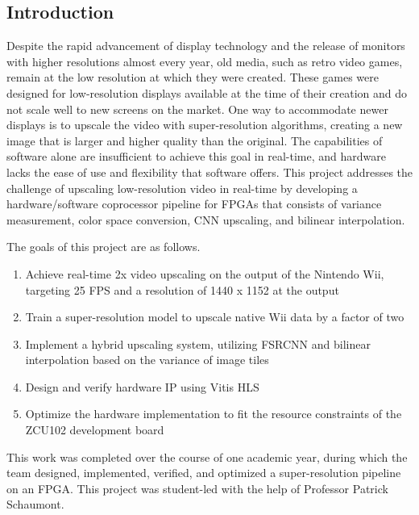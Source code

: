 \documentclass{article}
\begin{document}
\subsection*{Introduction} 
\noindent Despite the rapid advancement of display technology and the release of monitors with higher resolutions almost every year, old media, such as retro video games, remain at the low resolution at which they were created. These games were designed for low-resolution displays available at the time of their creation and do not scale well to new screens on the market. One way to accommodate newer displays is to upscale the video with super-resolution algorithms, creating a new image that is larger and higher quality than the original. The capabilities of software alone are insufficient to achieve this goal in real-time, and hardware lacks the ease of use and flexibility that software offers. This project addresses the challenge of upscaling low-resolution video in real-time by developing a hardware/software coprocessor pipeline for FPGAs that consists of variance measurement, color space conversion, CNN upscaling, and bilinear interpolation. 
\par 
\noindent The goals of this project are as follows.
\begin{enumerate} %
    \item Achieve real-time 2x video upscaling on the output of the Nintendo Wii, targeting 25 FPS and a resolution of 1440 x 1152 at the output
    \item Train a super-resolution model to upscale native Wii data by a factor of two
    \item Implement a hybrid upscaling system, utilizing FSRCNN \cite{fsrcnn_dong_accelerating_2016} and bilinear interpolation based on the variance of image tiles 
    \item Design and verify hardware IP using Vitis HLS
    \item Optimize the hardware implementation to fit the resource constraints of the ZCU102 development board
\end{enumerate}

\par This work was completed over the course of one academic year, during which the team designed, implemented, verified, and optimized a super-resolution pipeline on an FPGA. This project was student-led with the help of Professor Patrick Schaumont. 
\end{document}
